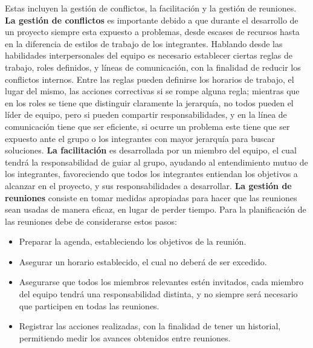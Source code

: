 \documentclass[letterpaper,12pt,openright,oneside]{article}
\theoremstyle{plain}
\begin{document}
Estas incluyen la gestión de conflictos, la facilitación y la gestión de reuniones.
\textbf{La gestión de conflictos} es importante debido a que durante el desarrollo de un proyecto siempre esta expuesto a problemas, desde escases de recursos hasta en la diferencia de estilos de trabajo de los integrantes. 
Hablando desde las habilidades interpersonales del equipo es necesario establecer ciertas reglas de trabajo, roles definidos, y líneas de comunicación, con la finalidad de reducir los conflictos internos. Entre las reglas pueden definirse los horarios de trabajo, el lugar del mismo, las acciones correctivas si se rompe alguna regla; mientras que en los roles se tiene que distinguir claramente la jerarquía, no todos pueden el líder de equipo, pero si pueden compartir responsabilidades, y en la línea de comunicación tiene que ser eficiente, si ocurre un problema este tiene que ser expuesto ante el grupo o los integrantes con mayor jerarquía para buscar soluciones.
\textbf{La facilitación} es desarrollada por un miembro del equipo, el cual tendrá la responsabilidad de guiar al grupo, ayudando al entendimiento mutuo de los integrantes, favoreciendo que todos los integrantes entiendan los objetivos a alcanzar en el proyecto, y sus responsabilidades a desarrollar.
\textbf{La gestión de reuniones} consiste en tomar medidas apropiadas para hacer que las reuniones sean usadas de manera eficaz, en lugar de perder tiempo. Para la planificación de las reuniones debe de considerarse estos pasos:

\begin{itemize}
    \item Preparar la agenda, estableciendo los objetivos de la reunión.
    \item Asegurar un horario establecido, el cual no deberá de ser excedido.
    \item Asegurarse que todos los miembros relevantes estén invitados, cada miembro del equipo tendrá una responsabilidad distinta, y no siempre será necesario que participen en todas las reuniones.
    \item Registrar las acciones realizadas, con la finalidad de tener un historial, permitiendo medir los avances obtenidos entre reuniones.
\end{itemize}

% 
% 
\end{document}
